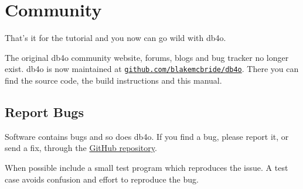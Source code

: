 
\chapter{Community}
\label{tut:db4ocommunity}

That's it for the tutorial and you now can go wild with db4o.

The original db4o community website, forums, blogs and bug tracker no longer exist. db4o is now maintained at \href{https://github.com/blakemcbride/db4o}{\nolinkurl{github.com/blakemcbride/db4o}}. There you can find the source code, the build instructions and this manual.

\section{Report Bugs}
\label{tut:db4ocommunity:bugrepors}

Software contains bugs and so does db4o. If you find a bug, please report it, or send a fix, through the \href{https://github.com/blakemcbride/db4o}{GitHub repository}.

When possible include a small test program which reproduces the issue. A test case avoids confusion and effort to reproduce the bug.
